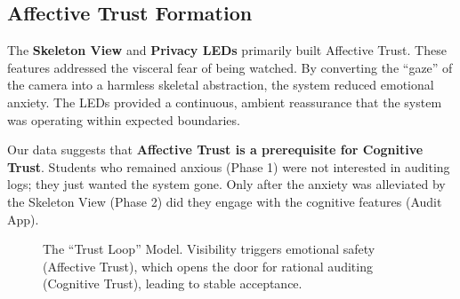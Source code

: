 \documentclass[conference]{IEEEtran}
\begin{document}
\subsection{Affective Trust Formation}
The \textbf{Skeleton View} and \textbf{Privacy LEDs} primarily built Affective Trust. These features addressed the visceral fear of being watched. By converting the ``gaze'' of the camera into a harmless skeletal abstraction, the system reduced emotional anxiety. The LEDs provided a continuous, ambient reassurance that the system was operating within expected boundaries.

Our data suggests that \textbf{Affective Trust is a prerequisite for Cognitive Trust}. Students who remained anxious (Phase 1) were not interested in auditing logs; they just wanted the system gone. Only after the anxiety was alleviated by the Skeleton View (Phase 2) did they engage with the cognitive features (Audit App).



\begin{figure}[htbp]
\centering
{}
\caption{The ``Trust Loop'' Model. Visibility triggers emotional safety (Affective Trust), which opens the door for rational auditing (Cognitive Trust), leading to stable acceptance.}
\label{fig:trust_loop}
\end{figure}

\end{document}

